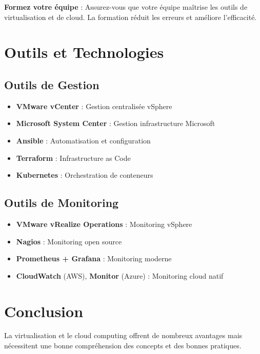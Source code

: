 \documentclass[11pt,a4paper]{article}
\begin{document}
\begin{tipbox}
\textbf{Formez votre équipe} : Assurez-vous que votre équipe maîtrise les outils de virtualisation et de cloud. La formation réduit les erreurs et améliore l'efficacité.
\end{tipbox}

\section{Outils et Technologies}

\subsection{Outils de Gestion}

\begin{itemize}
    \item \textbf{VMware vCenter} : Gestion centralisée vSphere
    \item \textbf{Microsoft System Center} : Gestion infrastructure Microsoft
    \item \textbf{Ansible} : Automatisation et configuration
    \item \textbf{Terraform} : Infrastructure as Code
    \item \textbf{Kubernetes} : Orchestration de conteneurs
\end{itemize}

\subsection{Outils de Monitoring}

\begin{itemize}
    \item \textbf{VMware vRealize Operations} : Monitoring vSphere
    \item \textbf{Nagios} : Monitoring open source
    \item \textbf{Prometheus + Grafana} : Monitoring moderne
    \item \textbf{CloudWatch} (AWS), \textbf{Monitor} (Azure) : Monitoring cloud natif
\end{itemize}

\section{Conclusion}

La virtualisation et le cloud computing offrent de nombreux avantages mais nécessitent une bonne compréhension des concepts et des bonnes pratiques. 
\end{document}
